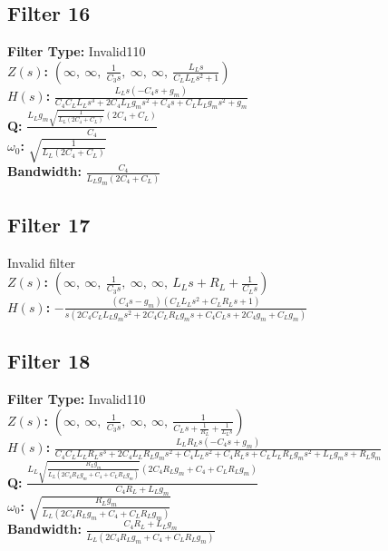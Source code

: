 \documentclass{article}
\begin{document}
\subsection*{Filter 16}
\textbf{Filter Type:} Invalid110 \\ 
\textbf{$Z(s)$:} $\left( \infty, \  \infty, \  \frac{1}{C_{3} s}, \  \infty, \  \infty, \  \frac{L_{L} s}{C_{L} L_{L} s^{2} + 1}\right)$ \\ 
\textbf{$H(s)$:} $\frac{L_{L} s \left(- C_{4} s + g_{m}\right)}{C_{4} C_{L} L_{L} s^{3} + 2 C_{4} L_{L} g_{m} s^{2} + C_{4} s + C_{L} L_{L} g_{m} s^{2} + g_{m}}$ \\ 
\textbf{Q:} $\frac{L_{L} g_{m} \sqrt{\frac{1}{L_{L} \left(2 C_{4} + C_{L}\right)}} \left(2 C_{4} + C_{L}\right)}{C_{4}}$ \\ 
\textbf{$\omega_0$:} $\sqrt{\frac{1}{L_{L} \left(2 C_{4} + C_{L}\right)}}$ \\ 
\textbf{Bandwidth:} $\frac{C_{4}}{L_{L} g_{m} \left(2 C_{4} + C_{L}\right)}$ \\ 
\subsection*{Filter 17}
Invalid filter \\ 
\textbf{$Z(s)$:} $\left( \infty, \  \infty, \  \frac{1}{C_{3} s}, \  \infty, \  \infty, \  L_{L} s + R_{L} + \frac{1}{C_{L} s}\right)$ \\ 
\textbf{$H(s)$:} $- \frac{\left(C_{4} s - g_{m}\right) \left(C_{L} L_{L} s^{2} + C_{L} R_{L} s + 1\right)}{s \left(2 C_{4} C_{L} L_{L} g_{m} s^{2} + 2 C_{4} C_{L} R_{L} g_{m} s + C_{4} C_{L} s + 2 C_{4} g_{m} + C_{L} g_{m}\right)}$ \\ 
\subsection*{Filter 18}
\textbf{Filter Type:} Invalid110 \\ 
\textbf{$Z(s)$:} $\left( \infty, \  \infty, \  \frac{1}{C_{3} s}, \  \infty, \  \infty, \  \frac{1}{C_{L} s + \frac{1}{R_{L}} + \frac{1}{L_{L} s}}\right)$ \\ 
\textbf{$H(s)$:} $\frac{L_{L} R_{L} s \left(- C_{4} s + g_{m}\right)}{C_{4} C_{L} L_{L} R_{L} s^{3} + 2 C_{4} L_{L} R_{L} g_{m} s^{2} + C_{4} L_{L} s^{2} + C_{4} R_{L} s + C_{L} L_{L} R_{L} g_{m} s^{2} + L_{L} g_{m} s + R_{L} g_{m}}$ \\ 
\textbf{Q:} $\frac{L_{L} \sqrt{\frac{R_{L} g_{m}}{L_{L} \left(2 C_{4} R_{L} g_{m} + C_{4} + C_{L} R_{L} g_{m}\right)}} \left(2 C_{4} R_{L} g_{m} + C_{4} + C_{L} R_{L} g_{m}\right)}{C_{4} R_{L} + L_{L} g_{m}}$ \\ 
\textbf{$\omega_0$:} $\sqrt{\frac{R_{L} g_{m}}{L_{L} \left(2 C_{4} R_{L} g_{m} + C_{4} + C_{L} R_{L} g_{m}\right)}}$ \\ 
\textbf{Bandwidth:} $\frac{C_{4} R_{L} + L_{L} g_{m}}{L_{L} \left(2 C_{4} R_{L} g_{m} + C_{4} + C_{L} R_{L} g_{m}\right)}$ \\ 
\end{document}
